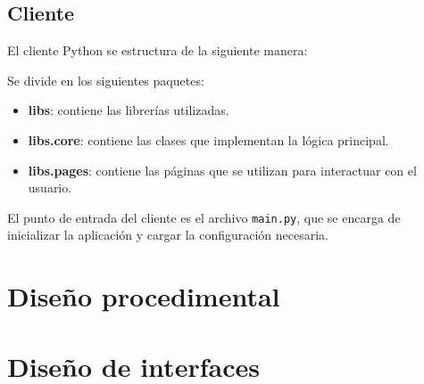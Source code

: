 
\subsection{Cliente}

El cliente Python se estructura de la siguiente manera:


Se divide en los siguientes paquetes:
\begin{itemize}
    \item \textbf{libs}: contiene las librerías utilizadas.
    \item \textbf{libs.core}: contiene las clases que implementan la lógica principal.
    \item \textbf{libs.pages}: contiene las páginas que se utilizan para interactuar con el usuario.
\end{itemize}

El punto de entrada del cliente es el archivo \texttt{main.py}, que se encarga de inicializar la aplicación y
cargar la configuración necesaria.

\section{Diseño procedimental}

\section{Diseño de interfaces}









